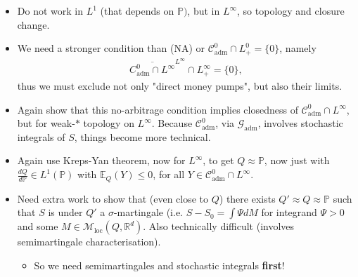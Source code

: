 \documentclass[12pt,a4paper, twoside]{article}
\theoremstyle{definition}
\newcommand{\EE}{\mathbb{E}} %
\newcommand{\PP}{\mathbb{P}} %
\begin{document}
\begin{itemize}
\item Do not work in $L^1$ (that depends on $\PP)$, but in $L^\infty$, so topology and closure change.
\item We need a stronger condition than (NA) or $\mathcal{C}_\text{adm}^0 \cap L_+^0 = \{0 \}$, namely
\begin{align*}
\overline{C_\text{adm}^0 \cap L^\infty}^{L^\infty} \cap L_+^\infty = \{0\},
\end{align*}
thus we must exclude not only "direct money pumps",  but also their limits. 
\item Again show that this no-arbitrage condition implies closedness of $\mathcal{C}_\text{adm}^0 \cap L^\infty$,  but for weak-$*$ topology on $L^\infty$. Because $\mathcal{C}_\text{adm}^0$, via $\mathcal{G}_\text{adm}$, involves stochastic integrals of $S$, things become more technical. 
\item Again use Kreps-Yan theorem,  now for $L^\infty$, to get $Q \approx \PP$, now just with $\frac{d Q}{d \PP} \in L^1( \PP)$ with $\EE_Q(Y) \leq 0$, for all $Y \in \mathcal{C}_\text{adm}^0 \cap L^\infty$. 
\item Need extra work to show that (even close to $Q$) there exists $Q' \approx Q \approx \PP$ such that $S$ is under $Q'$ a $\sigma$-martingale (i.e. $S-S_0 = \int \Psi dM$ for integrand $\Psi >0$ and some $M \in \mathcal{M}_\text{loc}(Q, \mathbb{R}^d)$. Also technically difficult (involves semimartingale characterisation).
\begin{itemize}
\item So we need semimartingales and stochastic integrals \textbf{first}!
\end{itemize}
\end{itemize}
\newpage
\end{document}
